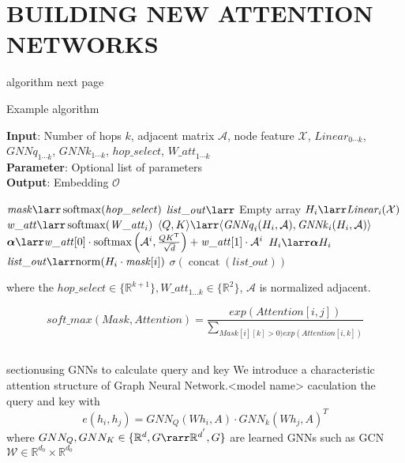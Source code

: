 \documentclass[letterpaper]{article} %
\begin{document}
\section{BUILDING NEW ATTENTION NETWORKS}
algorithm next page

\begin{algorithm}[tb]
\caption{Example algorithm}
\label{alg:algorithm}
\textbf{Input}: Number of hops $k$,
    adjacent matrix $\mathcal A$,
    node feature $\mathcal X$,
    $\mathit{Linear}_{0\cdots k}$,
    $\mathit{GNNq}_{1\cdots k}$,
    $\mathit{GNNk}_{1\cdots k}$,
    $\mathit{hop\_select}$,
    $\mathit{W\_att}_{1\cdots k}$\\
\textbf{Parameter}: Optional list of parameters\\
\textbf{Output}: Embedding $\mathcal O$
\begin{algorithmic}[1] %
\STATE $\mathit{mask}\larr\operatorname{softmax}(\mathit{hop\_select})$
\STATE $\mathit{list\_out}\larr$ Empty array
    \STATE $H_i \larr \mathit{Linear_i}(\mathcal X)$
        \STATE $\mathit{w\_att} \larr \operatorname{softmax}(\mathit{W\_att}_i)$
        \STATE
            $\langle Q, K \rangle \larr 
                \langle
                    \mathit{GNNq}_i(H_i, \mathcal A), 
                    \mathit{GNNk}_i(H_i, \mathcal A)
                \rangle
            $
        \STATE
            $\bm\alpha \larr
                \mathit{w\_att}[0] \cdot 
                    \operatorname{softmax} \Big( \mathcal A^i, \frac{ QK^{\mathrm T} }{ \sqrt{d} } \Big)
                +
                \mathit{w\_att}[1] \cdot \mathcal A^i
            $
        \STATE $H_i \larr \bm\alpha H_i$
    \ENDIF
    \STATE $\mathit{list\_out} \larr \mathrm{norm}(H_i \cdot \mathit{mask}[i])$
\ENDFOR
\RETURN $\sigma(\operatorname{concat}(\mathit{list\_out}))$
\end{algorithmic}
\end{algorithm}

where the $hop\_select\in\{\mathbb{R}^{k+1}\},W\_att_{1...k}\in\{\mathbb{R}^2\}$, $\mathcal{A}$ is normalized adjacent. 
{\small
$$soft\_max(Mask,Attention)= \frac{exp(Attention[i,j])}{\sum _{Mask[i][k]>0)exp(Attention[i,k])}}$$

}
\subsection{}section{using GNNs to calculate query and key}
We introduce a characteristic attention structure of Graph Neural Network.<model name> caculation the query and key with 
$$e(h_i,h_j)=GNN_Q(Wh_i,A)\cdot GNN_k(Wh_j,A)^T$$
where $GNN_Q,GNN_K\in\{\mathbb{R}^d,G\rarr \mathbb{R}^{d^{'}},G\}$ are learned GNNs such as GCN%
$\mathcal{W} \in \mathbb{R}^{d_0}\times\mathbb{R}^{d_0}$
\end{document}
